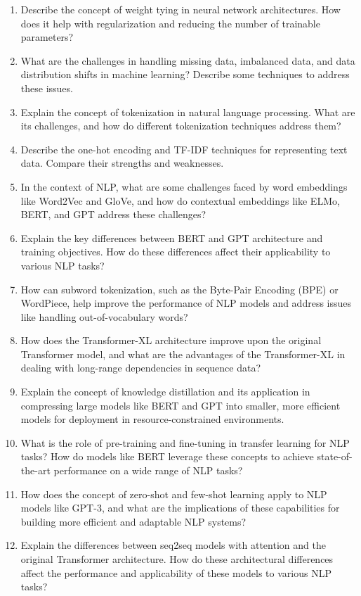 \documentclass[12pt]{article}
\begin{document}
\begin{enumerate}
  \item Describe the concept of weight tying in neural network architectures. How does it help with regularization and reducing the number of trainable parameters?
  \item What are the challenges in handling missing data, imbalanced data, and data distribution shifts in machine learning? Describe some techniques to address these issues.
  \item Explain the concept of tokenization in natural language processing. What are its challenges, and how do different tokenization techniques address them?
  \item Describe the one-hot encoding and TF-IDF techniques for representing text data. Compare their strengths and weaknesses.
  \item In the context of NLP, what are some challenges faced by word embeddings like Word2Vec and GloVe, and how do contextual embeddings like ELMo, BERT, and GPT address these challenges?
  \item Explain the key differences between BERT and GPT architecture and training objectives. How do these differences affect their applicability to various NLP tasks?
  \item How can subword tokenization, such as the Byte-Pair Encoding (BPE) or WordPiece, help improve the performance of NLP models and address issues like handling out-of-vocabulary words?
  \item How does the Transformer-XL architecture improve upon the original Transformer model, and what are the advantages of the Transformer-XL in dealing with long-range dependencies in sequence data?
  \item Explain the concept of knowledge distillation and its application in compressing large models like BERT and GPT into smaller, more efficient models for deployment in resource-constrained environments.
  \item What is the role of pre-training and fine-tuning in transfer learning for NLP tasks? How do models like BERT leverage these concepts to achieve state-of-the-art performance on a wide range of NLP tasks?
  \item How does the concept of zero-shot and few-shot learning apply to NLP models like GPT-3, and what are the implications of these capabilities for building more efficient and adaptable NLP systems?
  \item Explain the differences between seq2seq models with attention and the original Transformer architecture. How do these architectural differences affect the performance and applicability of these models to various NLP tasks?

\end{enumerate}
\end{document}
